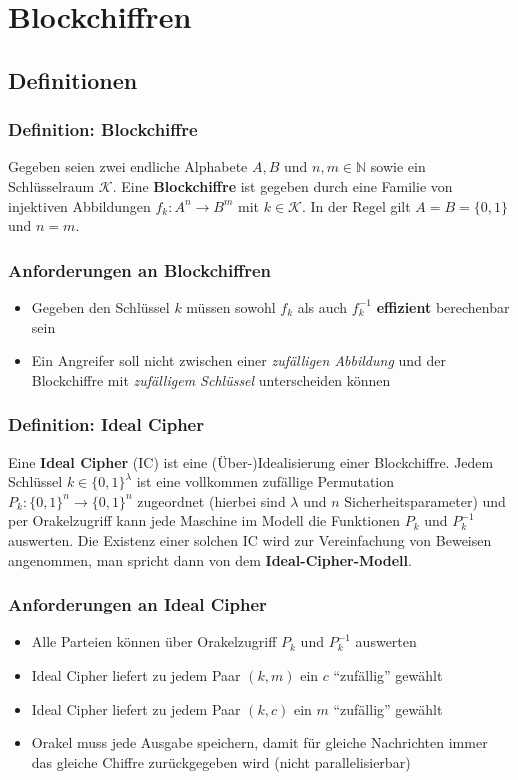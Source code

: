 \documentclass[12pt,A4]{extarticle}
\newcommand{\highlight}[1]{\textcolor{highlightColor}{\textbf{#1}}}
\begin{document}
\section{Blockchiffren}
\subsection{Definitionen}
\subsubsection{Definition: Blockchiffre}
Gegeben seien zwei endliche Alphabete $A, B$ und $n, m \in \mathbb{N}$ sowie ein Schlüsselraum $\mathcal{K}$. Eine \highlight{Blockchiffre} ist gegeben durch eine Familie von injektiven Abbildungen $f_k: A^n \rightarrow B^m$ mit $k \in \mathcal{K}$. In der Regel gilt $A = B = \{0, 1\}$ und $n = m$.

\subsubsection{Anforderungen an Blockchiffren}
\begin{itemize}
  \item{Gegeben den Schlüssel $k$ müssen sowohl $f_k$ als auch $f^{-1}_k$ \textbf{effizient} berechenbar sein}
  \item{Ein Angreifer soll nicht zwischen einer \textit{zufälligen Abbildung} und der Blockchiffre mit \textit{zufälligem Schlüssel} unterscheiden können}
\end{itemize}

\subsubsection{Definition: Ideal Cipher}
Eine \highlight{Ideal Cipher} (IC) ist eine (Über-)Idealisierung einer Blockchiffre. Jedem Schlüssel $k \in \{0, 1\}^\lambda$ ist eine vollkommen zufällige Permutation $P_k: \{0, 1\}^n \rightarrow \{0, 1\}^n$ zugeordnet (hierbei sind $\lambda$ und $n$ Sicherheitsparameter) und per Orakelzugriff kann jede Maschine im Modell die Funktionen $P_k$ und $P^{-1}_k$ auswerten. Die Existenz einer solchen IC wird zur Vereinfachung von Beweisen angenommen, man spricht dann von dem \textbf{Ideal-Cipher-Modell}.

\subsubsection{Anforderungen an Ideal Cipher}
\begin{itemize}
  \item{Alle Parteien können über Orakelzugriff $P_k$ und $P^{-1}_k$ auswerten}
  \item{Ideal Cipher liefert zu jedem Paar $(k, m)$ ein $c$ ``zufällig'' gewählt}
  \item{Ideal Cipher liefert zu jedem Paar $(k, c)$ ein $m$ ``zufällig'' gewählt}
  \item{Orakel muss jede Ausgabe speichern, damit für gleiche Nachrichten immer das gleiche Chiffre zurückgegeben wird (nicht parallelisierbar)}
\end{itemize}
\end{document}
